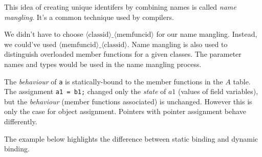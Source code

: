This idea of creating unique identifers by combining names is 
called \textit{name mangling}. It's a common technique used by compilers. 


We didn't have to choose 
$\langle \text{classid} \rangle \_ \langle \text{memfuncid} \rangle$
for our name mangling. Instead, we could've used 
$\langle \text{memfuncid} \rangle \_ \langle \text{classid} \rangle$.
Name mangling is also used to distinguish overloaded member functions 
for a given classes. The parameter names and types would be used in the 
name mangling process.

\frmrule



The \textit{behaviour} of \lstinline{a} is statically-bound to the member functions in the $A$ table. 
The assignment \lstinline{a1 = b1;} changed only the \textit{state} of $a1$ (values of field variables), 
but the \textit{behaviour} (member functions associated) is unchanged. However this is only the case 
for object assignment. Pointers with pointer assignment behave differently. 

\frmrule

\begin{example}
The example below highlights the difference between static binding and dynamic binding.

\begin{figure}[h]
\end{figure} 



\end{example}


